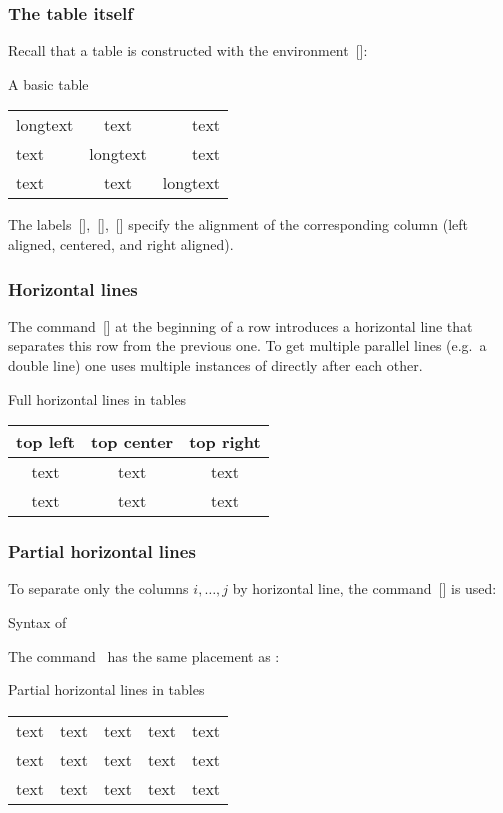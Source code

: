 \subsubsection{The table itself}

Recall that a table is constructed with the environment~[\envname]:

\begin{showlatex}{A basic table}
\begin{tabular}{lcr}
  longtext & text     & text      \\
  text     & longtext & text      \\
  text     & text     & longtext
\end{tabular}
\end{showlatex}
The labels~[\optname],~[\optname],~[\optname] specify the alignment of the corresponding column (left aligned, centered, and right aligned).

\subsubsection{Horizontal lines}

The command~[\comname] at the beginning of a row introduces a horizontal line that separates this row from the previous one.
To get multiple parallel lines (e.g.\ a double line) one uses multiple instances of  directly after each other.
\begin{showlatex}{Full horizontal lines in tables}
\begin{tabular}{ccc}
  top left & top center & top right \\
  \hline\hline
  text     & text       & text      \\
  \hline
  text     & text       & text
\end{tabular}
\end{showlatex}

\subsubsection{Partial horizontal lines}

To separate only the columns $i, \dotsc, j$ by horizontal line, the command~[\comname] is used:
\begin{showcode}{Syntax of }
\end{showcode}
The command~ has the same placement as :
\begin{showlatex}{Partial horizontal lines in tables}
\begin{tabular}{ccccc}
  text & text & text & text & text \\
  \cline{2-4}
  text & text & text & text & text \\
  \cline{1-2} \cline{4-5}
  text & text & text & text & text
\end{tabular}
\end{showlatex}

